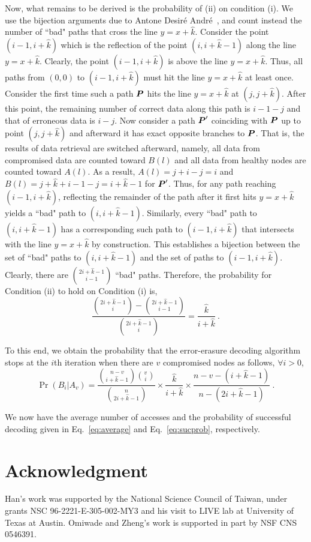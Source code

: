 \documentclass[10pt,journal,letterpaper,compsoc]{IEEEtran}
\newcommand{\bm}{\boldmath}
\newcommand{\PP}{\mbox{\bm $P$}}
\newcommand{\0}{{\bf 0}}
\begin{document}
Now, what remains to be derived is the probability of (ii) on condition (i).
We use the bijection arguments due to Antone Desir\'{e} Andr\'{e}~\cite{west:01}, and count
instead the number of ``bad" paths that cross the line $y = x+\hat{k}$. Consider the point $(i-1,i+\hat{k})$ which is the reflection of the point $(i,i+\hat{k}-1)$ along the line $y=x+\hat{k}$. Clearly, the point $(i - 1, i+\hat{k})$ is above the line $y = x +\hat{k}$. Thus, all paths from $(0,0)$ to $(i - 1, i+\hat{k})$ must hit the line $y = x + \hat{k}$ at least once. Consider the
first time such a path $\PP$ hits the line $y = x + \hat{k}$ at $(j, j+\hat{k})$. After this point, the remaining number of correct data  along this path is $i-1-j$ and that of erroneous data is $i-j$. Now consider a path $\PP'$ coinciding with $\PP$ up to point $(j,j+\hat{k})$ and afterward it has exact opposite branches to $\PP$. That is,
the results of data retrieval are switched afterward, namely, all data from compromised data
are counted toward $B(l)$ and all data from healthy nodes are counted toward
$A(l)$. As a result, $A(l) = j + i-j = i$ and $B(l) = j + \hat{k}
+ i -1- j = i+ \hat{k}-1$ for $\PP'$.  Thus, for any path reaching $(i - 1, i+\hat{k})$, reflecting the remainder of the path
after it first hits $y = x + \hat{k}$ yields a ``bad" path to $(i, i+\hat{k}-1)$. Similarly, every ``bad" path to  $(i, i+\hat{k}-1)$ has a corresponding such path to $(i - 1, i+\hat{k})$ that intersects with the line $y = x + \hat{k}$ by construction. This
establishes a bijection between the set of ``bad" paths to $(i, i+\hat{k}-1)$ and
the set of paths to $(i - 1, i+\hat{k})$. Clearly, there are ${2i+\hat{k}-1\choose i-1}$
``bad" paths. Therefore, the probability for Condition (ii) to hold on Condition (i) is,
\begin{equation}
\frac{{2i+\hat{k}-1\choose i} - {2i+\hat{k}-1\choose i-1}}{{2i+\hat{k}-1\choose i}} = \frac{\hat{k}}{i+\hat{k}}~.
\end{equation}

To this end, we obtain the probability that the error-erasure decoding
algorithm stops at the $i$th iteration when there are $v$ compromised nodes as
follows, $\forall i > 0$,
\begin{equation}
\Pr(B_i|A_v) =  \frac{{n-v\choose i+\hat{k}-1}{v \choose i}}{{n \choose 2i+\hat{k}-1}}\times \frac{\hat{k}}{i+\hat{k}} \times \frac{n - v - (i+\hat{k}-1)}{n - (2i+\hat{k}-1)}~.
\end{equation}

We now have the average number of accesses and the probability of
successful decoding given in Eq.~\eqref{eq:average} and
Eq.~\eqref{eq:sucprob}, respectively.
\section*{Acknowledgment}
Han's work was supported  by 
the National Science Council of Taiwan, under grants NSC
96-2221-E-305-002-MY3 and his
visit to LIVE lab at University of Texas at Austin. Omiwade and Zheng's work is supported in part by NSF CNS 0546391.


\end{document}
